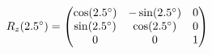\documentclass[preview]{standalone}
\begin{document}
\begin{align*}
\special{dvisvgm:raw <g id='unique000'>}R_z(2.5^\circ) = \begin{pmatrix} \cos(2.5^\circ) & -\sin(2.5^\circ) & 0 \\ \sin(2.5^\circ) & \cos(2.5^\circ) & 0 \\ 0 & 0 & 1 \end{pmatrix}\special{dvisvgm:raw </g>}
\end{align*}
\end{document}
